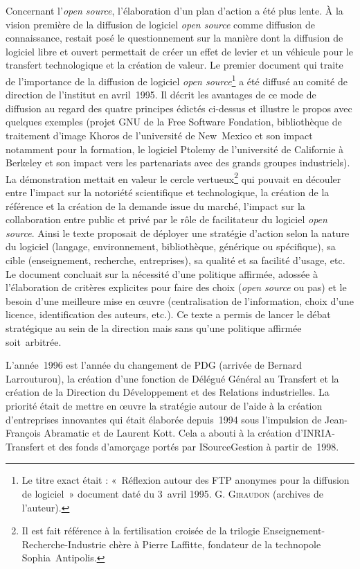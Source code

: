 \documentclass{FramateX}
\begin{document}
\begin{refsection}
Concernant l'\textit{open source}, l'élaboration d'un plan d'action a
été plus lente. À la vision première de la diffusion de logiciel
\textit{open source} comme diffusion de connaissance, restait posé le
questionnement sur la manière dont la diffusion de logiciel libre et
ouvert permettait de créer un effet de levier et un véhicule pour le
transfert technologique et la création de valeur. Le premier document
qui traite de l'importance de la diffusion de logiciel \textit{open
source}\footnote{Le titre exact était :
«~Réflexion autour des FTP anonymes pour la diffusion de logiciel~»
document daté du 3~avril 1995. G. \textsc{Giraudon} (archives de l'auteur).} a
été diffusé au comité de direction de l'institut en avril~1995. Il
décrit les avantages de ce mode de diffusion au regard des quatre
principes édictés ci-dessus et illustre le propos avec quelques
exemples (projet GNU de la Free Software Fondation, bibliothèque de
traitement d'image Khoros de l'université de New~Mexico et son impact
notamment pour la formation, le logiciel Ptolemy de l'université de
Californie à Berkeley et son impact vers les partenariats avec des
grands groupes industriels). La démonstration mettait en valeur le
cercle vertueux\footnote{Il est fait référence
à la fertilisation croisée de la trilogie
Enseignement-Recherche-Industrie chère à Pierre Laffitte, fondateur
de la technopole Sophia~Antipolis.} qui pouvait en découler entre
l'impact sur la notoriété scientifique et technologique, la création de
la référence et la création de la demande issue du marché, l'impact sur
la collaboration entre public et privé par le rôle de facilitateur du
logiciel \textit{open source}. Ainsi le texte proposait de déployer une
stratégie d'action selon la nature du logiciel (langage, environnement,
bibliothèque, générique ou spécifique), sa cible (enseignement,
recherche, entreprises), sa qualité et sa facilité d'usage, etc. Le
document concluait sur la nécessité d'une politique affirmée, adossée à
l'élaboration de critères explicites pour faire des choix (\textit{open
source} ou pas) et le besoin d'une meilleure mise en œuvre
(centralisation de l'information, choix d'une licence, identification
des auteurs, etc.). Ce texte a permis de lancer le débat stratégique au
sein de la direction mais sans qu'une politique affirmée soit~arbitrée.

L'année~1996 est l'année du changement de PDG (arrivée de Bernard
Larrouturou), la création d'une fonction de Délégué Général au
Transfert et la création de la Direction du Développement et des
Relations industrielles. La priorité était de mettre en œuvre la
stratégie autour de l'aide à la création d'entreprises innovantes qui
était élaborée depuis~1994 sous l'impulsion de Jean-François Abramatic
et de Laurent Kott. Cela a abouti à la création d'INRIA-Transfert et
des fonds d'amorçage portés par ISourceGestion à partir de~1998.



\end{refsection}
\end{document}
